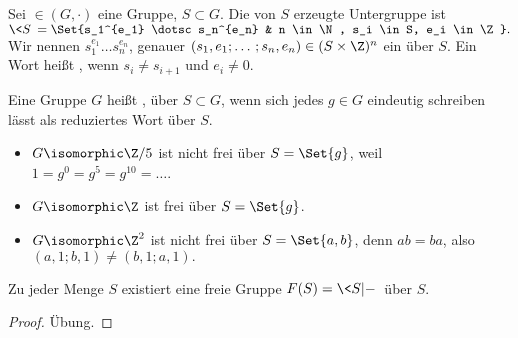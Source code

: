 \begin{df}
    Sei $∈(G, \cdot)$ eine Gruppe, $S \subset G$.
    Die von $S$ erzeugte Untergruppe ist
    \begin{math}
        \<S\> = \Set{s_1^{e_1} \dotsc s_n^{e_n} & n \in \N, s_i \in S, e_i \in \Z}.
    \end{math}
    Wir nennen $s_1^{e_1} \dotsc s_n^{e_n}$, genauer $(s_1,e_1; \dotsc; s_n, e_n) \in (S\times \Z)^n$ ein  über $S$.
    Ein Wort heißt , wenn $s_i \neq s_{i+1}$ und $e_i \neq 0$.
\end{df}

\begin{df}
    Eine Gruppe $G$ heißt , über $S \subset G$, wenn sich jedes $g \in G$ eindeutig schreiben lässt als reduziertes Wort über $S$.
\end{df}

\begin{ex}
    \begin{itemize}
        \item
            $G \isomorphic \Z/5$ ist nicht frei über $S = \Set{g}$, weil $1 = g^0 = g^5 = g^{10} = \dotsc$.
        \item
            $G \isomorphic \Z$ ist frei über $S = \Set{g}$.
        \item
            $G \isomorphic \Z^2$ ist nicht frei über $S = \Set{a,b}$, denn $ab = ba$, also
            \begin{math}
                (a,1;b,1) \neq (b,1;a,1).
            \end{math}
    \end{itemize}
\end{ex}

\begin{st}
    Zu jeder Menge $S$ existiert eine freie Gruppe $F(S) = \<S| - \>$ über $S$.
    \begin{proof}
        Übung.
    \end{proof}
\end{st}


